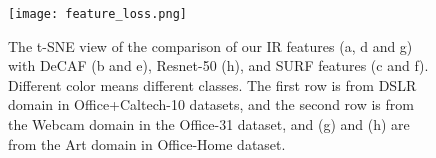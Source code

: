 \documentclass[10pt, conference, compsocconf]{IEEEtran}
\begin{document}
\begin{figure}[t]
\centering
\texttt{[image: feature\_loss.png]}
\caption{The t-SNE view of the comparison of our IR features (a, d and g) with DeCAF (b and e), Resnet-50 (h), and SURF features (c and f).  Different color means different classes. The first row is from DSLR domain in Office+Caltech-10 datasets, and the second row is from the Webcam domain in the Office-31 dataset, and (g) and (h) are from the Art domain in Office-Home dataset. 
}
\label{fig:t-sne}
\end{figure}

\iffalse
\begin{figure}[h]
\centering
\texttt{[image: Figures/hist.png]}
\caption{The histogram of different features in domain DSLR on Office+Caltech-10 dataset. The x-axis is the range of features, and the y-axis is the number of each feature.}
\label{fig:hist}
\end{figure}
\fi
\end{document}
